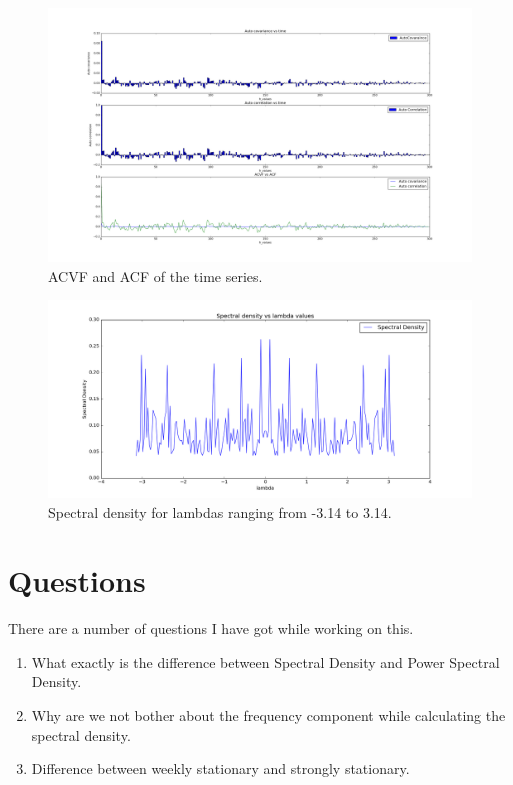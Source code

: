 \documentclass{article}
\begin{document}
\begin{figure}[ht!]
  \centering
  \includegraphics[width=1\textwidth]{images/spectral_density/acf_acvf}
  \caption{ACVF and ACF of the time series.\label{fig:sd_acf_acvf}}
\end{figure}

\begin{figure}[ht!]
  \centering
  \includegraphics[width=1\textwidth]{images/spectral_density/sd}
  \caption{Spectral density for lambdas ranging from -3.14 to 3.14.\label{fig:sd_sd}}
\end{figure}

\section{Questions}
There are a number of questions I have got while working on this.
\begin{enumerate}
  \item  What exactly is the difference between Spectral Density and Power Spectral Density.
  \item  Why are we not bother about the frequency component while calculating the spectral density.
  \item  Difference between weekly stationary and strongly stationary.
\end{enumerate}



\end{document}
